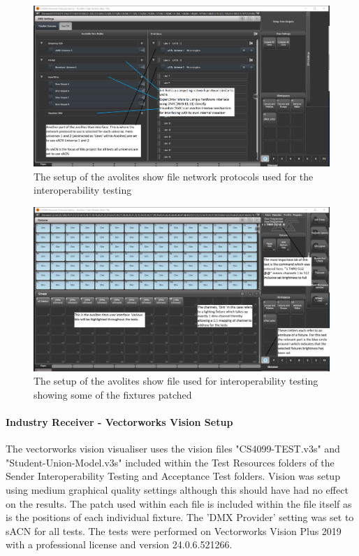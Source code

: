 \documentclass[11pt,a4paper]{article}
\begin{document}
\begin{figure}[H]
	\label{AVO_DMX_LINES}
	\includegraphics*[width=\textwidth]{avo-dmx-lines.png}
	\caption{The setup of the avolites show file network protocols used for the interoperability testing}
\end{figure}

\begin{figure}[H]
	\label{AVO_RECV_INTEROP_SETUP}
	\includegraphics*[width=\textwidth]{avo-file-dims.png}
	\caption{The setup of the avolites show file used for interoperability testing showing some of the fixtures patched}
\end{figure}

\paragraph*{Industry Receiver - Vectorworks Vision Setup}
The vectorworks vision visualiser uses the vision files "CS4099-TEST.v3s" and "Student-Union-Model.v3s" included within the Test Resources folders of the Sender Interoperability Testing and Acceptance Test folders. Vision was setup using medium graphical quality settings although this should have had no effect on the results. The patch used within each file is included within the file itself as is the positions of each individual fixture. The 'DMX Provider' setting was set to sACN for all tests. The tests were performed on Vectorworks Vision Plus 2019 with a professional license and version 24.0.6.521266.
\end{document}
